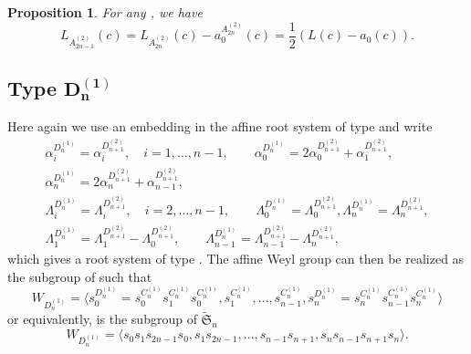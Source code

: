 \documentclass[pdftex]{sigma}
\newtheorem{Proposition}[Theorem]{Proposition}
 { \theoremstyle{definition}
\newtheorem{Definition}[Theorem]{Definition}
\newtheorem{Note}[Theorem]{Note}
\newtheorem{Example}[Theorem]{Example}
\newtheorem{Remark}[Theorem]{Remark} }
\numberwithin{equation}{section}
\begin{document}
\begin{Proposition}
	\label{Prop_A(2n-1,2)} For any , we have
	\begin{equation*}
	L_{A_{2n-1}^{(2)}}(c)=L_{A_{2n}^{(2)}}(c)-a_{0}^{A_{2n}^{(2)}}(c)=\frac{1}{2}
	(L(c)-a_{0}(c)).
	\end{equation*}
\end{Proposition}

\subsection[Type D\_n\^{}(1)]{Type $\boldsymbol{D_{n}^{(1)}}$}

Here again we use an embedding in the affine root system of type  and write
\begin{gather}
\alpha _{i}^{D_{n}^{(1)}}=\alpha _{i}^{D_{n+1}^{(2)}},\quad i=1,\dots ,n-1, \qquad
\alpha _{0}^{D_{n}^{(1)}}=2\alpha _{0}^{D_{n+1}^{(2)}}+\alpha
_{1}^{D_{n+1}^{(2)}} ,\nonumber\\
\alpha _{n}^{D_{n}^{(1)}}=2\alpha _{n}^{D_{n+1}^{(2)}}+\alpha
_{n-1}^{D_{n+1}^{(2)}},\nonumber\\
\Lambda _{i}^{D_{n}^{(1)}}=\Lambda _{i}^{D_{n+1}^{(2)}},\quad i=2,\dots ,n-1, \qquad
\Lambda _{0}^{D_{n}^{(1)}}=\Lambda _{0}^{D_{n+1}^{(2)}},\Lambda
_{n}^{D_{n}^{(1)}}=\Lambda _{n}^{D_{n+1}^{(2)}} ,\nonumber\\
\Lambda _{1}^{D_{n}^{(1)}}=\Lambda _{1}^{D_{n+1}^{(2)}}-\Lambda
_{0}^{D_{n+1}^{(2)}},\qquad \Lambda _{n-1}^{D_{n}^{(1)}}=\Lambda
_{n-1}^{D_{n+1}^{(2)}}-\Lambda _{n}^{D_{n+1}^{(2)}},
 \label{RelDA}
\end{gather}
which gives a root system of type . The affine Weyl group  can then be realized as the subgroup of
 such that
\begin{equation*}
W_{D_{n}^{(1)}}=\bigl\langle
s_{0}^{D_{n}^{(1)}}=s_{0}^{C_{n}^{(1)}}s_{1}^{C_{n}^{(1)}}s_{0}^{C_{n}^{(1)}},s_{1}^{C_{n}^{(1)}},\dots ,s_{n-1}^{C_{n}^{(1)}},s_{n}^{D_{n}^{(1)}}=s_{n}^{C_{n}^{(1)}}s_{n-1}^{C_{n}^{(1)}}s_{n}^{C_{n}^{(1)}}\bigr\rangle
\end{equation*}%
or equivalently,  is the subgroup of $\widetilde{\mathfrak{S%
}}_{n}$%
\begin{equation*}
W_{D_{n}^{(1)}}=\langle s_{0}s_{1}s_{2n-1}s_{0},s_{1}s_{2n-1},\dots
,s_{n-1}s_{n+1},s_{n}s_{n-1}s_{n+1}s_{n}\rangle .
\end{equation*}%
\end{document}
